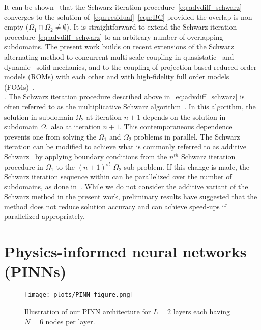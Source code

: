 \documentclass[oneside,final]{csri23}
\begin{document}
It can be shown~\cite{WDS:Lions1988, WDS:mota2017schwarz} that the Schwarz iteration procedure~\eqref{eq:advdiff_schwarz} converges to the solution of~\eqref{eqn:residual}--\eqref{eqn:BC} provided the overlap is non-empty ($\Omega_1 \cap \Omega_2 \neq \emptyset$). It is straightforward to extend the Schwarz iteration procedure~\eqref{eq:advdiff_schwarz} to an arbitrary number of overlapping subdomains. The present work builds on recent extensions of the Schwarz alternating method to concurrent multi-scale coupling in quasistatic~\cite{WDS:mota2017schwarz} and dynamic~\cite{WDS:mota2022schwarz} solid mechanics, and to the coupling of projection-based reduced order models (ROMs) with each other and with high-fidelity full order models (FOMs)~\cite{WDS:barnett2022schwarz}.  \\

.  
The Schwarz iteration procedure described above in~\eqref{eq:advdiff_schwarz} is often referred to as the multiplicative Schwarz algorithm~\cite{WDS:Gander2008}. In this algorithm, the solution in subdomain $\Omega_2$ at iteration $n+1$ depends on the solution in subdomain $\Omega_1$ also at iteration $n+1$. This contemporaneous dependence prevents one from solving the $\Omega_1$ and $\Omega_2$ problems in parallel.  The Schwarz iteration can be modified to achieve what is commonly referred to as additive Schwarz~\cite{WDS:Gander2008} by applying boundary conditions from the $n^{th}$ Schwarz iteration procedure in $\Omega_1$ to the $(n + 1)^{st}$ $\Omega_2$ sub-problem. If this change is made, the Schwarz iteration sequence within can be parallelized over the number of subdomains, as done in~\cite{WDS:LiD3M, WDS:LiDeepDDM}. While we do not consider the additive variant of the Schwarz method in the present work, preliminary results have suggested that the method does not reduce solution accuracy and can achieve speed-ups if parallelized appropriately.


\section{Physics-informed neural networks (PINNs)} \label{WDS:sec:pinns}

\begin{figure}[htbp!]
    \begin{center}       
        \texttt{[image: plots/PINN\_figure.png]}
    \end{center}
	\caption{Illustration of our PINN architecture for $L = 2$ layers each having $N = 6$ nodes per layer.}
    \label{fig:PINN}
\end{figure}
\end{document}
